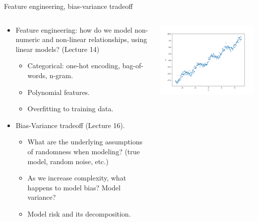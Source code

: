 \documentclass[aspectratio=169]{../latex_main/tntbeamer}  %
\begin{document}
	
	
	
	\begin{frame}{Feature engineering, bias-variance tradeoff}
	          \begin{columns}
	            \begin{column}{.7\textwidth}

	            \begin{itemize}
	                \item Feature engineering: how do we model non-numeric and non-linear relationships, using linear models? (Lecture 14)
	                \begin{itemize}
	                    \item Categorical: one-hot encoding, bag-of-words, n-gram.
	                    \item Polynomial features.
	                    \item Overfitting to training data.
	                \end{itemize}
	                \item  Bias-Variance tradeoff (Lecture 16).
	                \begin{itemize}
	                    \item What are the underlying assumptions of randomness when modeling? (true model, random noise, etc.)
	                    \item As we increase complexity, what happens to model bias? Model variance?
	                    \item Model risk and its decomposition.
	                \end{itemize}
	            \end{itemize}
	            \end{column}
	            
	            
	            \begin{column}{.3\textwidth}
	                      \begin{center}
	                          \includegraphics[scale=.65]{Bild6}
	                      \end{center} 
	            \end{column}
	       \end{columns}
	\end{frame}
	
\end{document}
